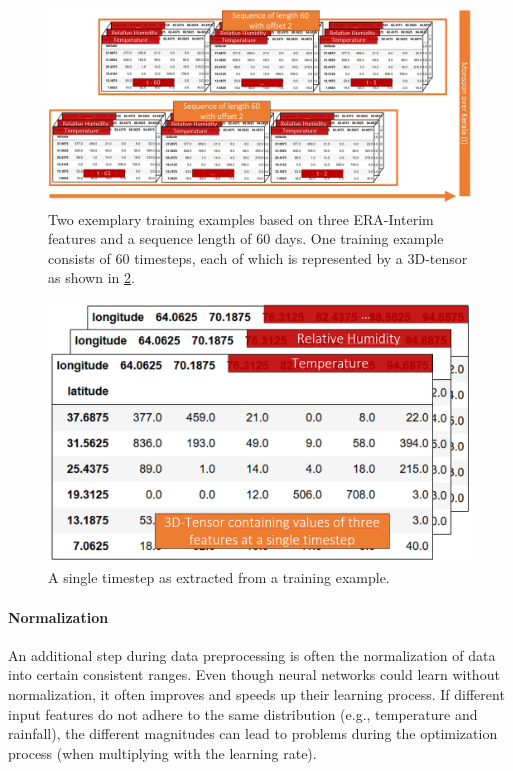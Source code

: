 \begin{figure}[h!]
  \centering
  \includegraphics[width=\linewidth]{./99_appendix/img/E4_preprocessing}
  \caption{Two exemplary training examples based on three ERA-Interim features and a sequence length of 60 days. One training example consists of 60 timesteps, each of which is represented by a 3D-tensor as shown in \cref{fig:e4_tensor}.}
  \label{fig:e4_preprocessing}
\end{figure}

\begin{figure}[h!]
  \centering
  \includegraphics[width=0.6\linewidth]{./99_appendix/img/E4_tensor}
  \caption{A single timestep as extracted from a training example.}
  \label{fig:e4_tensor}
\end{figure}

\paragraph{Normalization} An additional step during data preprocessing is often the normalization of data into certain consistent ranges. Even though neural networks could learn without normalization, it often improves and speeds up their learning process. If different input features do not adhere to the same distribution (e.g., temperature and rainfall), the different magnitudes can lead to problems during the optimization process (when multiplying with the learning rate).

